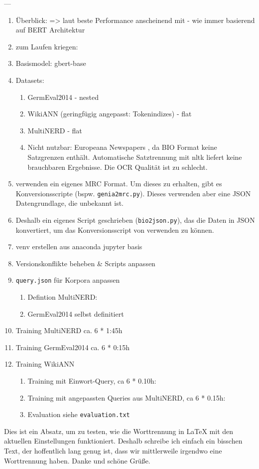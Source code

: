 ---
\begin{enumerate}
    \item Überblick: \cite{nner-survey} => laut \cite[11]{nner-survey} beste Performance anscheinend mit \cite{li2019unified} - wie immer basierend auf BERT Architektur
    \item \cite{li2019unified} zum Laufen kriegen:
    \item Basismodel: gbert-base \parencite{gbert}
    \item Datasets:
    \begin{enumerate}
        \item GermEval2014 \parencite{germeval2014} - nested
        \item WikiANN \parencite{wikiann} (geringfügig angepasst: Tokenindizes) - flat
        \item MultiNERD \parencite{multinerd} - flat
        \item Nicht nutzbar: Europeana Newspapers \parencite{europeana}, da BIO Format keine Satzgrenzen enthält. Automatische Satztrennung mit nltk liefert keine brauchbaren Ergebnisse. Die OCR Qualität ist zu schlecht.
    \end{enumerate}
    \item \cite{li2019unified} verwenden ein eigenes MRC Format. Um dieses zu erhalten, gibt es Konversionsscripte (bspw. \texttt{genia2mrc.py}). Dieses verwenden aber eine JSON Datengrundlage, die unbekannt ist.
    \item Deshalb ein eigenes Script geschrieben (\texttt{bio2json.py}), das die Daten in JSON konvertiert, um das Konversionsscript von \cite{li2019unified} verwenden zu können.
    \item venv erstellen aus anaconda jupyter basis
    \item Versionskonflikte beheben \& Scripts anpassen
    \item \texttt{query.json} für Korpora anpassen
    \begin{enumerate}
        \item Defintion MultiNERD: \cite[4]{multinerd}
        \item GermEval2014 selbst definitiert
    \end{enumerate}
    \item Training MultiNERD ca. 6 * 1:45h
    \item Training GermEval2014 ca. 6 * 0:15h
    \item Training WikiANN
    \begin{enumerate}
        \item Training mit Einwort-Query, ca 6 * 0.10h:
        \item Training mit angepassten Queries aus MultiNERD, ca 6 * 0.15h:
        \item Evaluation siehe \texttt{evaluation.txt}
    \end{enumerate}
    
\end{enumerate}

Dies ist ein Absatz, um zu testen, wie die Worttrennung in LaTeX mit den aktuellen
Einstellungen funktioniert. Deshalb schreibe ich einfach ein bisschen Text, der
hoffentlich lang genug ist, dass wir mittlerweile irgendwo eine Worttrennung
haben. Danke und schöne Grüße.